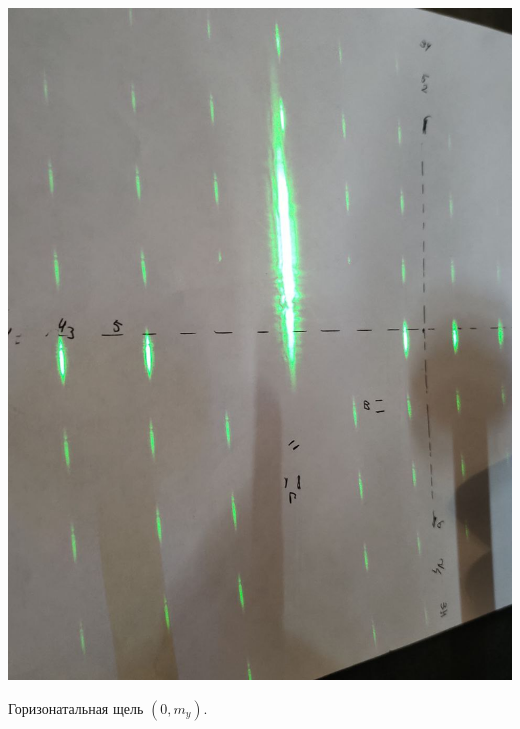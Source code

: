  \begin{minipage}{0.40\textwidth}
\begin{center}
\includegraphics[width = \textwidth]{images/4.jpg}
\end{center}

\begin{center}
Горизонатальная щель $\left(0, m_{y}\right)$. 
\end{center}
\end{minipage}
